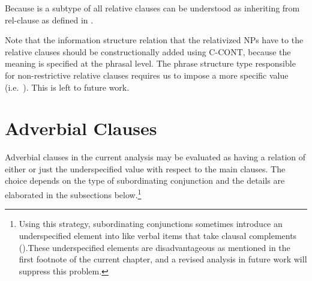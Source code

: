 


Because  is a subtype of  all
relative clauses can be understood as inheriting from rel-clause as
defined in .




\noindent Note that the information structure relation that the
relativized NPs have to the relative clauses should be
constructionally added using C-CONT, because the meaning is specified
at the phrasal level.  The phrase structure type responsible for
non-restrictive relative clauses requires us to impose a more specific
value (i.e.\ ). This is left to future work.



\section{Adverbial Clauses}
\label{10:ssec:adjunct}

Adverbial clauses in the current analysis may be evaluated as having a
relation of either  or just the underspecified value
 with respect to the main clauses.  The choice depends
on the type of subordinating conjunction and the details are
elaborated in the subsections below.\footnote{Using this strategy,
  subordinating conjunctions sometimes introduce an underspecified
   element into  like verbal items that take
  clausal complements ().These underspecified
  elements are disadvantageous as mentioned in the first footnote of
  the current chapter, and a revised analysis in future work will
  suppress this problem.}


